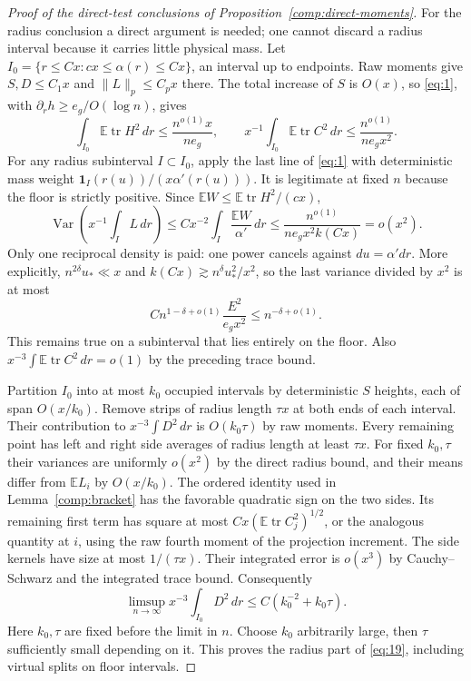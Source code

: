 \begin{proof}[Proof of the direct-test conclusions of
Proposition~\ref{comp:direct-moments}]
For the radius conclusion a direct argument is needed; one cannot
discard a radius interval because it carries little physical mass.
Let
$I_0=\{r\le Cx:cx\le\alpha(r)\le Cx\}$, an interval up to endpoints.
Raw moments give $S,D\le C_1x$ and $\|L\|_p\le C_px$ there.
The total increase of $S$ is $O(x)$, so \eqref{eq:1}, with
$\partial_r h\ge e_g/O(\log n)$, gives
\[
 \int_{I_0}\mathbb E\operatorname{tr}H^2\,dr
       \le\frac{n^{o(1)}x}{ne_g},\qquad
 x^{-1}\int_{I_0}\mathbb E\operatorname{tr}C^2\,dr
       \le\frac{n^{o(1)}}{ne_gx^2}.
\]
For any radius subinterval $I\subset I_0$, apply the last line of
\eqref{eq:1} with deterministic mass weight
$\mathbf1_I(r(u))/(x\alpha'(r(u)))$.  It is legitimate at fixed $n$
because the floor is strictly positive.  Since
$\mathbb EW\le\mathbb E\operatorname{tr}H^2/(cx)$,
\[
 \operatorname{Var}\left(x^{-1}\int_I L\,dr\right)
 \le Cx^{-2}\int_I\frac{\mathbb EW}{\alpha'}\,dr
 \le\frac{n^{o(1)}}{ne_gx^2k(Cx)}=o(x^2).
\]
Only one reciprocal density is paid: one power cancels against
$du=\alpha' dr$.  More explicitly,
$n^{2\delta}u_*\ll x$ and
$k(Cx)\gtrsim n^\delta u_*^2/x^2$, so the last variance divided by
$x^2$ is at most
\[
 Cn^{1-\delta+o(1)}\frac{E^2}{e_gx^2}
 \le n^{-\delta+o(1)}.
\]
This remains true on a subinterval that lies entirely on the floor.
Also $x^{-3}\int\mathbb E\operatorname{tr}C^2\,dr=o(1)$ by the
preceding trace bound.

Partition $I_0$ into at most $k_0$ occupied intervals by deterministic
$S$ heights, each of span $O(x/k_0)$.  Remove strips of radius length
$\tau x$ at both ends of each interval.  Their contribution to
$x^{-3}\int D^2\,dr$ is $O(k_0\tau)$ by raw moments.  Every remaining
point has left and right side averages of radius length at least
$\tau x$.  For fixed $k_0,\tau$ their variances are uniformly $o(x^2)$
by the direct radius bound, and their means differ from $\mathbb EL_i$
by $O(x/k_0)$.  The ordered identity used in
Lemma~\ref{comp:bracket} has the favorable quadratic sign on the two
sides.  Its remaining first term has square at most
$Cx(\mathbb E\operatorname{tr}C_j^2)^{1/2}$, or the analogous
quantity at $i$, using the raw fourth moment of the projection
increment.  The side kernels have size at most $1/(\tau x)$.
Their integrated error is $o(x^3)$ by Cauchy--Schwarz and the
integrated trace bound.  Consequently
\[
 \limsup_{n\to\infty}x^{-3}\int_{I_0}D^2\,dr
 \le C(k_0^{-2}+k_0\tau).
\]
Here $k_0,\tau$ are fixed before the limit in $n$.  Choose $k_0$
arbitrarily large, then $\tau$ sufficiently small depending on it.
This proves the radius part of \eqref{eq:19}, including virtual
splits on floor intervals.


\end{proof}
